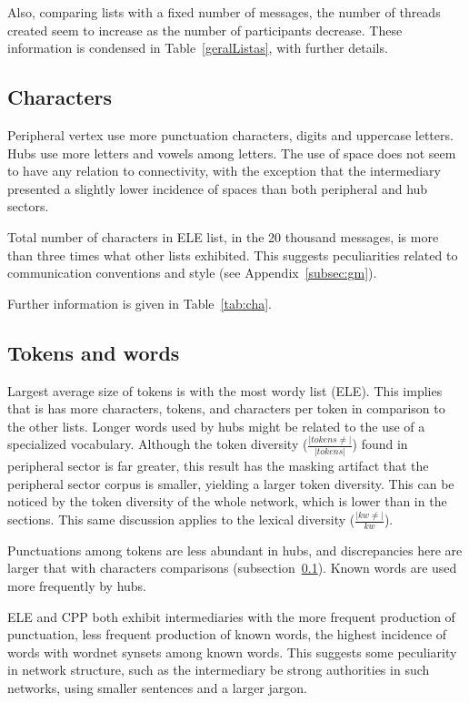 \documentclass[%
 aip,
 jmp,%
 amsmath,amssymb,
 reprint,%
]{revtex4-1}
\begin{document}
Also, comparing lists with a fixed number of messages, the number of threads created seem to increase as the number of participants decrease. These information is condensed in Table~\ref{geralListas}, with further details.

\subsection{Characters}\label{sec:cha}
Peripheral vertex use more punctuation characters, digits and uppercase letters. Hubs use more letters and vowels among letters. The use of space does not seem to have any relation to connectivity, with the exception that the intermediary presented a slightly lower incidence of spaces than both peripheral and hub sectors. 
    
Total number of characters in ELE list, in the 20 thousand messages, is more than three times what other lists exhibited. This suggests peculiarities related to communication conventions and style (see Appendix~\ref{subsec:gm}).

Further information is given in Table~\ref{tab:cha}.

\subsection{Tokens and words}\label{subsec:tw}

Largest average size of tokens is with  the most wordy list (ELE). This implies that is has more characters, tokens, and characters per token in comparison to the other lists. Longer words used by hubs might be related to the use of a specialized vocabulary. Although the token diversity ($\frac{|tokens \neq|}{|tokens|}$) found in peripheral sector is far greater, this result has the masking artifact that the peripheral sector corpus is smaller, yielding a larger token diversity. This can be noticed by the token diversity of the whole network, which is lower than in the sections. This same discussion applies to the lexical diversity ($\frac{|kw\neq|}{kw}$).

Punctuations among tokens are less abundant in hubs, and discrepancies here are larger that with characters comparisons (subsection~\ref{sec:cha}). Known words are used more frequently by hubs.

ELE and CPP both exhibit intermediaries with the more frequent production of punctuation, less frequent production of known words, the highest incidence of words with wordnet synsets among known words. This suggests some peculiarity in network structure, such as the intermediary be strong authorities in such networks, using smaller sentences and a larger jargon.
\end{document}
